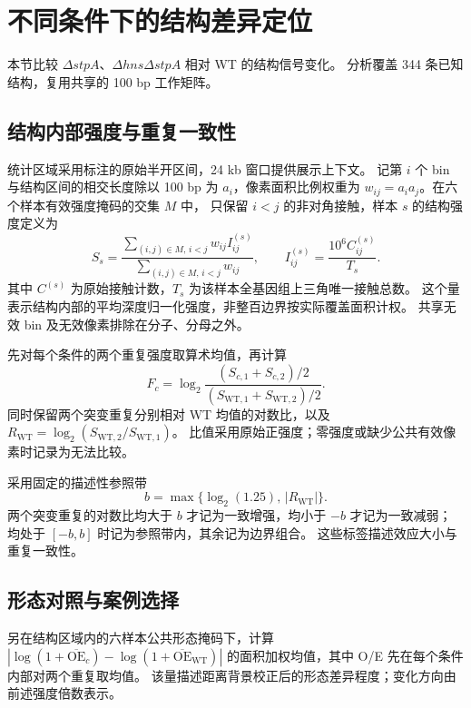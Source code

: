 \section{不同条件下的结构差异定位}
本节比较 $\Delta stpA$、$\Delta hns\Delta stpA$ 相对 WT 的结构信号变化。
分析覆盖 344 条已知结构，复用共享的 100 bp 工作矩阵。

\subsection{结构内部强度与重复一致性}
统计区域采用标注的原始半开区间，24 kb 窗口提供展示上下文。
记第 $i$ 个 bin 与结构区间的相交长度除以 100 bp 为 $a_i$，像素面积比例权重为
$w_{ij}=a_i a_j$。在六个样本有效强度掩码的交集 $M$ 中，
只保留 $i<j$ 的非对角接触，样本 $s$ 的结构强度定义为
\begin{equation}
  S_s=\frac{\sum_{(i,j)\in M,\,i<j}w_{ij}I^{(s)}_{ij}}
                {\sum_{(i,j)\in M,\,i<j}w_{ij}},
  \qquad I^{(s)}_{ij}=\frac{10^6 C^{(s)}_{ij}}{T_s}.
\end{equation}
其中 $C^{(s)}$ 为原始接触计数，$T_s$ 为该样本全基因组上三角唯一接触总数。
这个量表示结构内部的平均深度归一化强度，非整百边界按实际覆盖面积计权。
共享无效 bin 及无效像素排除在分子、分母之外。

先对每个条件的两个重复强度取算术均值，再计算
\begin{equation}
  F_c=\log_2\frac{(S_{c,1}+S_{c,2})/2}
                       {(S_{\mathrm{WT},1}+S_{\mathrm{WT},2})/2}.
\end{equation}
同时保留两个突变重复分别相对 WT 均值的对数比，以及
$R_{\mathrm{WT}}=\log_2(S_{\mathrm{WT},2}/S_{\mathrm{WT},1})$。
比值采用原始正强度；零强度或缺少公共有效像素时记录为无法比较。

采用固定的描述性参照带
\begin{equation}
  b=\max\{\log_2(1.25),\,|R_{\mathrm{WT}}|\}.
\end{equation}
两个突变重复的对数比均大于 $b$ 才记为一致增强，均小于 $-b$ 才记为一致减弱；
均处于 $[-b,b]$ 时记为参照带内，其余记为边界组合。
这些标签描述效应大小与重复一致性。

\subsection{形态对照与案例选择}
另在结构区域内的六样本公共形态掩码下，计算
$|\log(1+\overline{\mathrm{OE}}_c)-\log(1+\overline{\mathrm{OE}}_{\mathrm{WT}})|$
的面积加权均值，其中 O/E 先在每个条件内部对两个重复取均值。
该量描述距离背景校正后的形态差异程度；变化方向由前述强度倍数表示。

